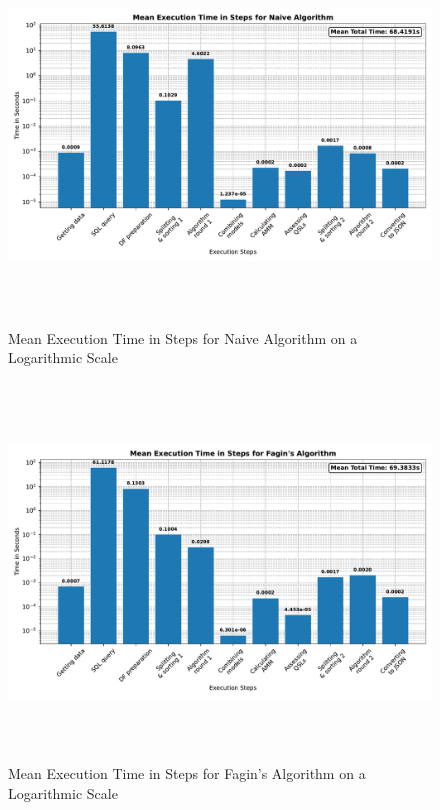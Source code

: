 \begin{figure}[htbp]
    \centering
    \includegraphics[height=10cm]{plots/executiontime_naive.pdf}
    \caption{Mean Execution Time in Steps for Naive Algorithm on a Logarithmic Scale}
    \label{fig:timenaive}
  \end{figure}

  \begin{figure}[htbp]
    \centering
    \includegraphics[height=10cm]{plots/executiontime_fagins.pdf}
    \caption{Mean Execution Time in Steps for Fagin's Algorithm on a Logarithmic Scale}
    \label{fig:timefagin}
  \end{figure}

